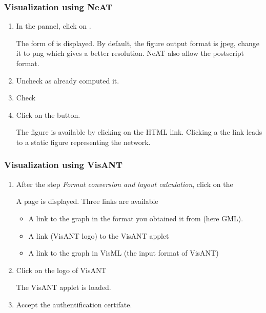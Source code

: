 \subsubsection{Visualization using NeAT}
\begin{enumerate}
 \item In the  pannel, click on .
 
 The form of  is displayed. By default, the figure output format is jpeg, change it to png which gives a better resolution. NeAT also allow the postscript format.
 \item Uncheck  as  already computed it.
 \item Check 
 \item Click on the  button.
 
 The figure is available by clicking on the HTML link. Clicking a the link leads to a static figure representing the
 network.  
 
\end{enumerate}

\subsubsection{Visualization using VisANT}
\begin{enumerate}
\item After the step \textit{Format conversion and layout calculation}, click on the 

A page is displayed. Three links are available
\begin{itemize}
        \item A link to the graph in the format you obtained it from  (here GML).
        \item A link (VisANT logo) to the VisANT applet
        \item A link to the graph in VisML (the input format of VisANT)
\end{itemize}

\item Click on the logo of VisANT

The VisANT applet is loaded. 

\item Accept the authentification certifate. 

\end{enumerate}
